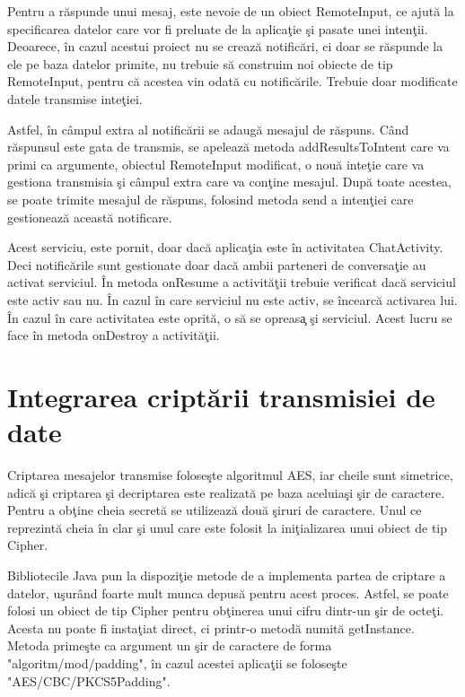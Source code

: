 Pentru a r\u{a}spunde unui mesaj, este nevoie de un obiect RemoteInput, ce ajut\u{a} la specificarea datelor care vor fi preluate de la aplica\c{t}ie \c{s}i pasate unei inten\c{t}ii. Deoarece, \^{i}n cazul acestui proiect nu se creaz\u{a} notific\u{a}ri, ci doar se r\u{a}spunde la ele pe baza datelor primite, nu trebuie s\u{a} construim noi obiecte de tip RemoteInput, pentru c\u{a} acestea vin odat\u{a} cu notific\u{a}rile. Trebuie doar modificate datele transmise inte\c{t}iei. 

Astfel, \^{i}n c\^{a}mpul extra al notific\u{a}rii se adaug\u{a} mesajul de r\u{a}spuns. C\^{a}nd r\u{a}spunsul este gata de transmis, se apeleaz\u{a} metoda addResultsToIntent care va primi ca argumente, obiectul RemoteInput modificat, o nou\u{a} inte\c{t}ie care va gestiona transmisia \c{s}i c\^{a}mpul extra care va con\c{t}ine mesajul. Dup\u{a} toate acestea, se poate trimite mesajul de r\u{a}spuns, folosind metoda send a inten\c{t}iei care gestioneaz\u{a} aceast\u{a} notificare.

Acest serviciu, este pornit, doar dac\u{a} aplica\c{t}ia este \^{i}n activitatea ChatActivity. Deci notific\u{a}rile sunt gestionate doar dac\u{a} ambii parteneri de conversa\c{t}ie au activat serviciul. \^{I}n metoda onResume a activit\u{a}\c{t}ii trebuie verificat dac\u{a} serviciul este activ sau nu. \^{I}n cazul \^{i}n care serviciul nu este activ, se \^{i}ncearc\u{a} activarea lui. \^{I}n cazul \^{i}n care activitatea este oprit\u{a}, o s\u{a} se opreas\c{a} \c{s}i serviciul. Acest lucru se face \^{i}n metoda onDestroy a activit\u{a}\c{t}ii.
 
\section{Integrarea cript\u{a}rii transmisiei de date}

Criptarea mesajelor transmise folose\c{s}te algoritmul AES, iar cheile sunt simetrice, adic\u{a} \c{s}i criptarea \c{s}i decriptarea este realizat\u{a} pe baza aceluia\c{s}i \c{s}ir de caractere. Pentru a ob\c{t}ine cheia secret\u{a} se utilizeaz\u{a} dou\u{a} \c{s}iruri de caractere. Unul ce reprezint\u{a} cheia \^{i}n clar \c{s}i unul care este folosit la ini\c{t}ializarea unui obiect de tip Cipher.

Bibliotecile Java pun la dispozi\c{t}ie metode de a implementa partea de criptare a datelor, u\c{s}ur\^{a}nd foarte mult munca depus\u{a} pentru acest proces. Astfel, se poate folosi un obiect de tip Cipher pentru ob\c{t}inerea unui cifru dintr-un \c{s}ir de octe\c{t}i. Acesta nu poate fi insta\c{t}iat direct, ci printr-o metod\u{a} numit\u{a} getInstance. Metoda prime\c{s}te ca argument un \c{s}ir de caractere de forma "algoritm/mod/padding", \^{i}n cazul acestei aplica\c{t}ii se folose\c{s}te "AES/CBC/PKCS5Padding". 


